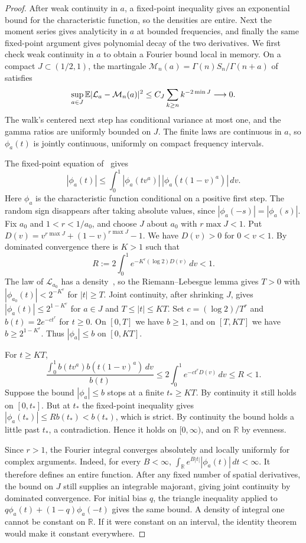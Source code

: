 \begin{proof}
After weak continuity in $a$, a fixed-point inequality gives an
exponential bound for the characteristic function, so the densities
are entire. Next the moment series gives analyticity in $a$
at bounded frequencies, and finally the same fixed-point argument
gives polynomial decay of the two derivatives.
We first check weak continuity in $a$ to obtain a Fourier bound local in memory. On a compact
$J\subset(1/2,1)$, the martingale
$\mathcal M_n(a)=\Gamma(n)S_n/\Gamma(n+a)$ of~\cite[(2.4), Appendix~A]{bercu2018} satisfies
\[
 \sup_{a\in J}\mathbb{E}|\mathcal L_a-\mathcal M_n(a)|^2
 \le C_J\sum_{k\ge n}k^{-2\min J}\longrightarrow0.
\]
The walk's centered next step has conditional variance at most one,
and the gamma ratios are uniformly bounded on $J$. The finite laws are
continuous in $a$, so $\phi_a(t)$ is jointly continuous, uniformly on
compact frequency intervals.

The fixed-point equation of~\cite[Theorem~1.1 and (2.10)]{glr2026} gives
\[
 |\phi_a(t)|\le\int_0^1|\phi_a(tv^a)|\,
                  |\phi_a(t(1-v)^a)|\,dv.
\]
Here $\phi_a$ is the characteristic function conditional on a positive
first step. The random sign disappears after taking absolute values, since
$|\phi_a(-s)|=|\phi_a(s)|$.
Fix $a_0$ and $1<r<1/a_0$, and choose $J$ about $a_0$ with $r\max J<1$.
Put $D(v)=v^{r\max J}+(1-v)^{r\max J}-1$. We have $D(v)>0$ for
$0<v<1$. By dominated convergence there is $K>1$ such that
\[
 R:=2\int_0^1e^{-K^r(\log2)D(v)}\,dv<1.
\]
The law of $\mathcal L_{a_0}$ has a density~\cite[Theorem~1.3]{glr2026}, so
the Riemann--Lebesgue lemma gives $T>0$ with
$|\phi_{a_0}(t)|<2^{-K^r}$ for $|t|\ge T$. Joint continuity, after
shrinking $J$, gives $|\phi_a(t)|\le2^{1-K^r}$ for $a\in J$ and
$T\le|t|\le KT$. Set
$c=(\log2)/T^r$ and $b(t)=2e^{-ct^r}$ for $t\ge0$.
On $[0,T]$ we have $b\ge1$, and on $[T,KT]$ we have
$b\ge2^{1-K^r}$. Thus $|\phi_a|\le b$ on $[0,KT]$.

For $t\ge KT$,
\[
 \frac{\int_0^1b(tv^a)b(t(1-v)^a)\,dv}{b(t)}
 \le2\int_0^1e^{-ct^rD(v)}\,dv\le R<1.
\]
Suppose the bound $|\phi_a|\le b$ stops at a finite
$t_*\ge KT$. By continuity it still holds on $[0,t_*]$.
But at $t_*$ the fixed-point inequality gives
$|\phi_a(t_*)|\le Rb(t_*)<b(t_*)$, which is strict. By continuity the
bound holds a little past $t_*$, a contradiction. Hence it holds on
$[0,\infty)$, and on $\mathbb R$ by evenness.

Since $r>1$, the Fourier integral converges absolutely and locally
uniformly for complex arguments. Indeed, for every $B<\infty$,
$\int_{\mathbb R}e^{B|t|}|\phi_a(t)|\,dt<\infty$.
It therefore defines an entire function.
After any fixed number of spatial derivatives, the bound on $J$
still supplies an integrable majorant, giving joint continuity by
dominated convergence. For initial bias $q$, the triangle inequality
applied to $q\phi_a(t)+(1-q)\phi_a(-t)$ gives the same bound.
A density of integral one cannot be constant on $\mathbb R$.
If it were constant on an interval, the identity theorem would
make it constant everywhere.


\end{proof}
